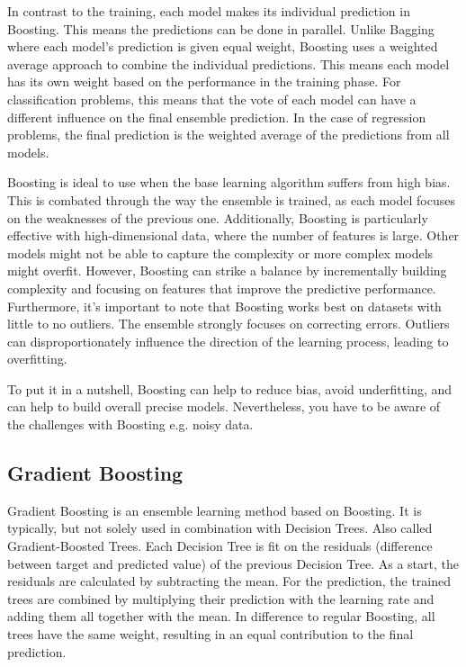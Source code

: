 In contrast to the training, each model makes its individual prediction in Boosting.
This means the predictions can be done in parallel.
Unlike Bagging where each model's prediction is given equal weight, Boosting uses
a weighted average approach to combine the individual predictions. This means
each model has its own weight based on the performance in the training phase.
For classification problems, this means that the vote of each model can have
a different influence on the final ensemble prediction.
In the case of regression problems, the final prediction is the weighted average
of the predictions from all models.

Boosting is ideal to use when the base learning algorithm suffers from high bias.
This is combated through the way the ensemble is trained, as each model focuses on the
weaknesses of the previous one.
Additionally, Boosting is particularly effective with high-dimensional data, where
the number of features is large. Other models might not be able to capture the 
complexity or more complex models might overfit.
However, Boosting can strike a balance by incrementally building complexity and 
focusing on features that improve the predictive performance.
Furthermore, it's important to note that Boosting works best on datasets with little 
to no outliers. The ensemble strongly focuses on correcting errors. Outliers can 
disproportionately influence the direction of the learning process, leading
to overfitting.


To put it in a nutshell, Boosting can help to reduce bias, avoid underfitting,
and can help to build overall precise models. Nevertheless, you have to be aware
of the challenges with Boosting e.g. noisy data.

\subsection{Gradient Boosting}
Gradient Boosting \citep{breiman1997arcing, friedman2001greedy, friedman2002stochastic} 
is an ensemble learning method based on Boosting. It is typically, but not solely used in 
combination with Decision Trees. Also called Gradient-Boosted Trees.
Each Decision Tree is fit on the residuals (difference between target and predicted
value) of the previous Decision Tree. As a start, the residuals are calculated by
subtracting the mean.
For the prediction, the trained trees are combined by multiplying their prediction
with the learning rate and adding them all together with the mean.
In difference to regular Boosting, all trees have the same weight, resulting
in an equal contribution to the final prediction.

